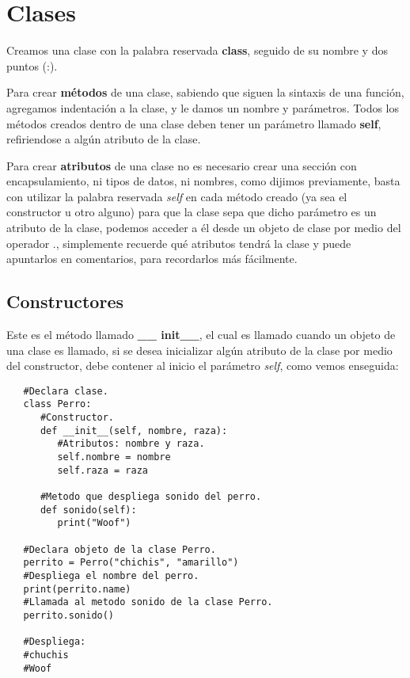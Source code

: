 \section{Clases}
\hspace{0.55cm}Creamos una clase con la palabra reservada \textbf{class}, seguido de su nombre y dos puntos (:).

Para crear \textbf{métodos} de una clase, sabiendo que siguen la sintaxis de una función,  agregamos indentación a la clase, y le damos un nombre y parámetros. Todos los métodos creados dentro de una clase deben tener un parámetro llamado \textbf{self}, refiriendose a algún atributo de la clase.

Para crear \textbf{atributos} de una clase no es necesario crear una sección con encapsulamiento, ni tipos de datos, ni nombres, como dijimos previamente, basta con utilizar la palabra reservada \textit{self} en cada método creado (ya sea el constructor u otro alguno) para que la clase sepa que dicho parámetro es un atributo de la clase, podemos acceder a él desde un objeto de clase por medio del operador ., simplemente recuerde qué atributos tendrá la clase y puede apuntarlos en comentarios, para recordarlos más fácilmente.


\subsection{Constructores}
\hspace{0.55cm}Este es el método llamado \textbf{\_\_ init\_\_}, el cual es llamado cuando un objeto de una clase es llamado, si se desea inicializar algún atributo de la clase por medio del constructor, debe contener al inicio el parámetro \textit{self}, como vemos enseguida:
\begin{lstlisting}
   #Declara clase.
   class Perro:
      #Constructor.
      def __init__(self, nombre, raza):
         #Atributos: nombre y raza.
         self.nombre = nombre
         self.raza = raza
      
      #Metodo que despliega sonido del perro.
      def sonido(self):
         print("Woof")
      
   #Declara objeto de la clase Perro.
   perrito = Perro("chichis", "amarillo")
   #Despliega el nombre del perro.
   print(perrito.name)
   #Llamada al metodo sonido de la clase Perro.
   perrito.sonido()
      
   #Despliega:
   #chuchis
   #Woof
\end{lstlisting}


